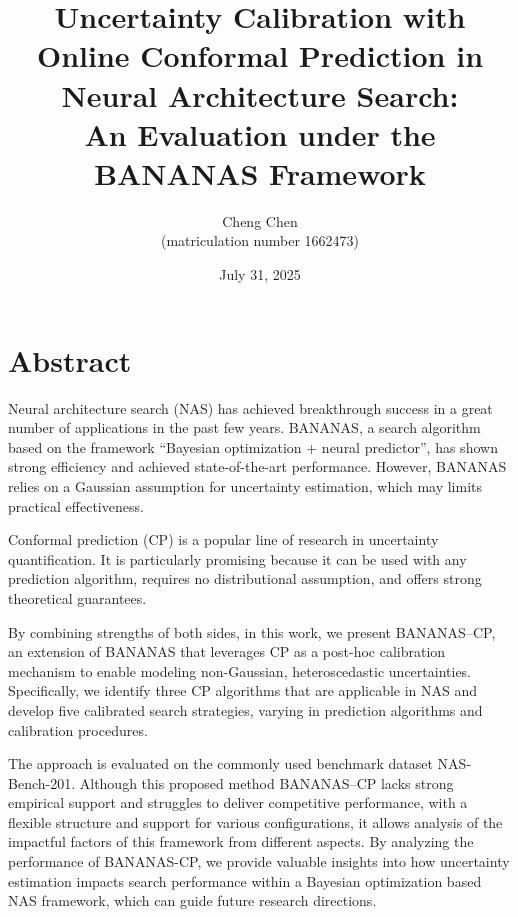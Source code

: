 \documentclass[a4paper,oneside,bibliography=totoc]{scrbook}
\begin{document}
\setlength{\skip\footins}{20pt}
\frontmatter \subject{Master Thesis} %
\title{\LARGE 
	Uncertainty Calibration with Online Conformal Prediction in Neural Architecture Search: \\ 
	An Evaluation under the BANANAS Framework 
}
\author{
	Cheng Chen\\ (matriculation number 1662473)} \date{July 31, 2025
}
\publishers{
	{\small Submitted to}\\
	Data and Web Science Group\\Prof.\ Dr.\ Margret Keuper\\University of Mannheim\\
}
\maketitle

\chapter{Abstract}
Neural architecture search (NAS) has achieved breakthrough success in a great number of applications in the past few years. BANANAS, a search algorithm based on the framework “Bayesian optimization + neural predictor”, has shown strong efficiency and achieved state-of-the-art performance. However, BANANAS relies on a Gaussian assumption for uncertainty estimation, which may limits practical effectiveness. 

Conformal prediction (CP) is a popular line of research in uncertainty quantification. It is particularly promising because it can be used with any prediction algorithm, requires no distributional assumption, and offers strong theoretical guarantees.
 
By combining strengths of both sides, in this work, we present BANANAS--CP, an extension of BANANAS that leverages CP as a post-hoc calibration mechanism to enable modeling non-Gaussian, heteroscedastic uncertainties. Specifically, we identify three CP algorithms that are applicable in NAS and develop five calibrated search strategies, varying in  prediction algorithms and calibration procedures. 

The approach is evaluated on the commonly used benchmark dataset NAS-Bench-201. Although this proposed method BANANAS--CP lacks strong empirical support and struggles to deliver competitive performance, with a flexible structure and support for various configurations, it allows analysis of the impactful factors of this framework from different aspects. By analyzing the performance of BANANAS-CP, we provide valuable insights into how uncertainty estimation impacts search performance within a Bayesian optimization based NAS framework, which can guide future research directions.
\end{document}
